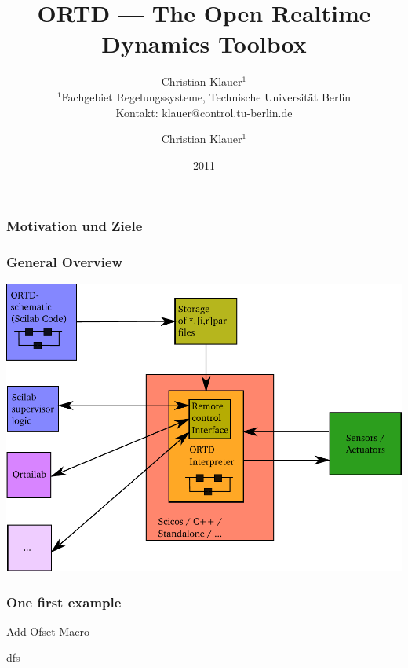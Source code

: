\documentclass[serif,9pt,xcolor=dvipsnames]{beamer}
\title[]{ORTD --- The Open Realtime Dynamics Toolbox}
\subtitle{} %
\date{2011}
\author{Christian Klauer$^{1}$\\
{\tiny $^{1}$Fachgebiet Regelungssysteme, Technische Universität Berlin\\
Kontakt: klauer@control.tu-berlin.de}
}
\begin{document}

\author{Christian Klauer$^{1}$}

\begin{frame}
 \frametitle{Motivation und Ziele}






\end{frame}

\begin{frame}

 \frametitle{General Overview}



\includegraphics[trim=0mm 0mm 0mm 0mm, clip,width=0.95\linewidth]{../pictures/ortd_principle.pdf}

\end{frame}



\begin{frame}

 \frametitle{One first example}


  \begin{block}{Add Ofset Macro}

dfs

    



  \end{block}

%   


% 


\end{frame}
\end{document}
